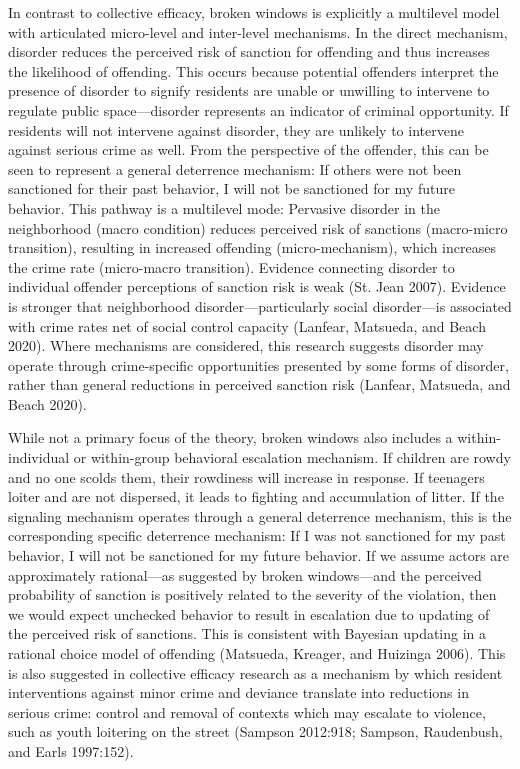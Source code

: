 \documentclass [11pt, proquest] {uwthesis}[2015/03/03]
\begin{document}
In contrast to collective efficacy, broken windows is explicitly a multilevel model with articulated micro-level and inter-level mechanisms. In the direct mechanism, disorder reduces the perceived risk of sanction for offending and thus increases the likelihood of offending. This occurs because potential offenders interpret the presence of disorder to signify residents are unable or unwilling to intervene to regulate public space---disorder represents an indicator of criminal opportunity. If residents will not intervene against disorder, they are unlikely to intervene against serious crime as well. From the perspective of the offender, this can be seen to represent a general deterrence mechanism: If others were not been sanctioned for their past behavior, I will not be sanctioned for my future behavior. This pathway is a multilevel mode: Pervasive disorder in the neighborhood (macro condition) reduces perceived risk of sanctions (macro-micro transition), resulting in increased offending (micro-mechanism), which increases the crime rate (micro-macro transition). Evidence connecting disorder to individual offender perceptions of sanction risk is weak (St. Jean 2007). Evidence is stronger that neighborhood disorder---particularly social disorder---is associated with crime rates net of social control capacity (Lanfear, Matsueda, and Beach 2020). Where mechanisms are considered, this research suggests disorder may operate through crime-specific opportunities presented by some forms of disorder, rather than general reductions in perceived sanction risk (Lanfear, Matsueda, and Beach 2020).

While not a primary focus of the theory, broken windows also includes a within-individual or within-group behavioral escalation mechanism. If children are rowdy and no one scolds them, their rowdiness will increase in response. If teenagers loiter and are not dispersed, it leads to fighting and accumulation of litter. If the signaling mechanism operates through a general deterrence mechanism, this is the corresponding specific deterrence mechanism: If I was not sanctioned for my past behavior, I will not be sanctioned for my future behavior. If we assume actors are approximately rational---as suggested by broken windows---and the perceived probability of sanction is positively related to the severity of the violation, then we would expect unchecked behavior to result in escalation due to updating of the perceived risk of sanctions. This is consistent with Bayesian updating in a rational choice model of offending (Matsueda, Kreager, and Huizinga 2006). This is also suggested in collective efficacy research as a mechanism by which resident interventions against minor crime and deviance translate into reductions in serious crime: control and removal of contexts which may escalate to violence, such as youth loitering on the street (Sampson 2012:918; Sampson, Raudenbush, and Earls 1997:152).
\end{document}
